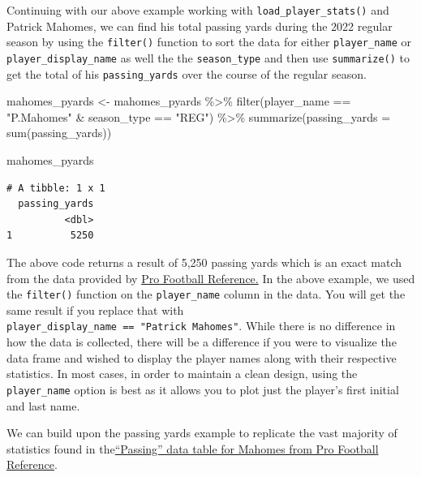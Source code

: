 \documentclass[
  letterpaper,
]{krantz}
\newenvironment{Shaded}{\begin{snugshade}}{\end{snugshade}}
\newcommand{\AttributeTok}[1]{\textcolor[rgb]{0.40,0.45,0.13}{#1}}
\newcommand{\FunctionTok}[1]{\textcolor[rgb]{0.28,0.35,0.67}{#1}}
\newcommand{\NormalTok}[1]{\textcolor[rgb]{0.00,0.23,0.31}{#1}}
\newcommand{\OtherTok}[1]{\textcolor[rgb]{0.00,0.23,0.31}{#1}}
\newcommand{\SpecialCharTok}[1]{\textcolor[rgb]{0.37,0.37,0.37}{#1}}
\newcommand{\StringTok}[1]{\textcolor[rgb]{0.13,0.47,0.30}{#1}}
\begin{document}
Continuing with our above example working with
\texttt{load\_player\_stats()} and Patrick Mahomes, we can find his
total passing yards during the 2022 regular season by using the
\texttt{filter()} function to sort the data for either
\texttt{player\_name} or \texttt{player\_display\_name} as well the the
\texttt{season\_type} and then use \texttt{summarize()} to get the total
of his \texttt{passing\_yards} over the course of the regular season.

\begin{Shaded}
\begin{Highlighting}[]
\NormalTok{mahomes\_pyards }\OtherTok{\textless{}{-}}\NormalTok{ mahomes\_pyards }\SpecialCharTok{\%\textgreater{}\%}
  \FunctionTok{filter}\NormalTok{(player\_name }\SpecialCharTok{==} \StringTok{"P.Mahomes"} \SpecialCharTok{\&}\NormalTok{ season\_type }\SpecialCharTok{==} \StringTok{"REG"}\NormalTok{) }\SpecialCharTok{\%\textgreater{}\%}
  \FunctionTok{summarize}\NormalTok{(}\AttributeTok{passing\_yards =} \FunctionTok{sum}\NormalTok{(passing\_yards))}

\NormalTok{mahomes\_pyards}
\end{Highlighting}
\end{Shaded}

\begin{verbatim}
# A tibble: 1 x 1
  passing_yards
          <dbl>
1          5250
\end{verbatim}

The above code returns a result of 5,250 passing yards which is an exact
match from the data provided by
\href{https://www.pro-football-reference.com/players/M/MahoPa00.htm}{Pro
Football Reference.} In the above example, we used the \texttt{filter()}
function on the \texttt{player\_name} column in the data. You will get
the same result if you replace that with
\texttt{player\_display\_name\ ==\ "Patrick\ Mahomes"}. While there is
no difference in how the data is collected, there will be a difference
if you were to visualize the data frame and wished to display the player
names along with their respective statistics. In most cases, in order to
maintain a clean design, using the \texttt{player\_name} option is best
as it allows you to plot just the player's first initial and last name.

We can build upon the passing yards example to replicate the vast
majority of statistics found in
the\href{https://www.pro-football-reference.com/players/M/MahoPa00.htm\#passing}{``Passing''
data table for Mahomes from Pro Football Reference}.
\end{document}
